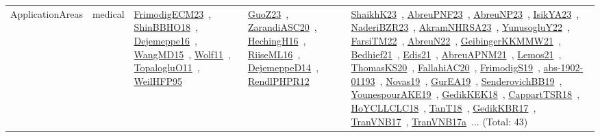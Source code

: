 {\begin{longtable}{lp{3cm}>{\raggedright\arraybackslash}p{6cm}>{\raggedright\arraybackslash}p{6cm}>{\raggedright\arraybackslash}p{8cm}}
\index{medical}\index{ApplicationAreas!medical}ApplicationAreas & medical & \href{../works/FrimodigECM23.pdf}{FrimodigECM23}~\cite{FrimodigECM23}, \href{../works/ShinBBHO18.pdf}{ShinBBHO18}~\cite{ShinBBHO18}, \href{../works/Dejemeppe16.pdf}{Dejemeppe16}~\cite{Dejemeppe16}, \href{../works/WangMD15.pdf}{WangMD15}~\cite{WangMD15}, \href{../works/Wolf11.pdf}{Wolf11}~\cite{Wolf11}, \href{../works/TopalogluO11.pdf}{TopalogluO11}~\cite{TopalogluO11}, \href{../works/WeilHFP95.pdf}{WeilHFP95}~\cite{WeilHFP95} & \href{../works/GuoZ23.pdf}{GuoZ23}~\cite{GuoZ23}, \href{../works/ZarandiASC20.pdf}{ZarandiASC20}~\cite{ZarandiASC20}, \href{../works/HechingH16.pdf}{HechingH16}~\cite{HechingH16}, \href{../works/RiiseML16.pdf}{RiiseML16}~\cite{RiiseML16}, \href{../works/DejemeppeD14.pdf}{DejemeppeD14}~\cite{DejemeppeD14}, \href{../works/RendlPHPR12.pdf}{RendlPHPR12}~\cite{RendlPHPR12} & \href{../works/ShaikhK23.pdf}{ShaikhK23}~\cite{ShaikhK23}, \href{../works/AbreuPNF23.pdf}{AbreuPNF23}~\cite{AbreuPNF23}, \href{../works/AbreuNP23.pdf}{AbreuNP23}~\cite{AbreuNP23}, \href{../works/IsikYA23.pdf}{IsikYA23}~\cite{IsikYA23}, \href{../works/NaderiBZR23.pdf}{NaderiBZR23}~\cite{NaderiBZR23}, \href{../works/AkramNHRSA23.pdf}{AkramNHRSA23}~\cite{AkramNHRSA23}, \href{../works/YunusogluY22.pdf}{YunusogluY22}~\cite{YunusogluY22}, \href{../works/FarsiTM22.pdf}{FarsiTM22}~\cite{FarsiTM22}, \href{../works/AbreuN22.pdf}{AbreuN22}~\cite{AbreuN22}, \href{../works/GeibingerKKMMW21.pdf}{GeibingerKKMMW21}~\cite{GeibingerKKMMW21}, \href{../works/Bedhief21.pdf}{Bedhief21}~\cite{Bedhief21}, \href{../works/Edis21.pdf}{Edis21}~\cite{Edis21}, \href{../works/AbreuAPNM21.pdf}{AbreuAPNM21}~\cite{AbreuAPNM21}, \href{../works/Lemos21.pdf}{Lemos21}~\cite{Lemos21}, \href{../works/ThomasKS20.pdf}{ThomasKS20}~\cite{ThomasKS20}, \href{../works/FallahiAC20.pdf}{FallahiAC20}~\cite{FallahiAC20}, \href{../works/FrimodigS19.pdf}{FrimodigS19}~\cite{FrimodigS19}, \href{../works/abs-1902-01193.pdf}{abs-1902-01193}~\cite{abs-1902-01193}, \href{../works/Novas19.pdf}{Novas19}~\cite{Novas19}, \href{../works/GurEA19.pdf}{GurEA19}~\cite{GurEA19}, \href{../works/SenderovichBB19.pdf}{SenderovichBB19}~\cite{SenderovichBB19}, \href{../works/YounespourAKE19.pdf}{YounespourAKE19}~\cite{YounespourAKE19}, \href{../works/GedikKEK18.pdf}{GedikKEK18}~\cite{GedikKEK18}, \href{../works/CappartTSR18.pdf}{CappartTSR18}~\cite{CappartTSR18}, \href{../works/HoYCLLCLC18.pdf}{HoYCLLCLC18}~\cite{HoYCLLCLC18}, \href{../works/TanT18.pdf}{TanT18}~\cite{TanT18}, \href{../works/GedikKBR17.pdf}{GedikKBR17}~\cite{GedikKBR17}, \href{../works/TranVNB17.pdf}{TranVNB17}~\cite{TranVNB17}, \href{../works/TranVNB17a.pdf}{TranVNB17a}~\cite{TranVNB17a}... (Total: 43)\\

\end{longtable}}
